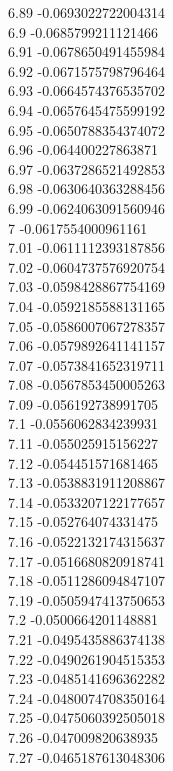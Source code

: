 {6.89	-0.0693022722004314\\
6.9	-0.0685799211121466\\
6.91	-0.0678650491455984\\
6.92	-0.0671575798796464\\
6.93	-0.0664574376535702\\
6.94	-0.0657645475599192\\
6.95	-0.0650788354374072\\
6.96	-0.064400227863871\\
6.97	-0.0637286521492853\\
6.98	-0.0630640363288456\\
6.99	-0.0624063091560946\\
7	-0.0617554000961161\\
7.01	-0.0611112393187856\\
7.02	-0.0604737576920754\\
7.03	-0.0598428867754169\\
7.04	-0.0592185588131165\\
7.05	-0.0586007067278357\\
7.06	-0.0579892641141157\\
7.07	-0.0573841652319711\\
7.08	-0.0567853450005263\\
7.09	-0.056192738991705\\
7.1	-0.0556062834239931\\
7.11	-0.055025915156227\\
7.12	-0.054451571681465\\
7.13	-0.0538831911208867\\
7.14	-0.0533207122177657\\
7.15	-0.052764074331475\\
7.16	-0.0522132174315637\\
7.17	-0.0516680820918741\\
7.18	-0.0511286094847107\\
7.19	-0.0505947413750653\\
7.2	-0.0500664201148881\\
7.21	-0.0495435886374138\\
7.22	-0.0490261904515353\\
7.23	-0.0485141696362282\\
7.24	-0.0480074708350164\\
7.25	-0.0475060392505018\\
7.26	-0.047009820638935\\
7.27	-0.0465187613048306\\
}
